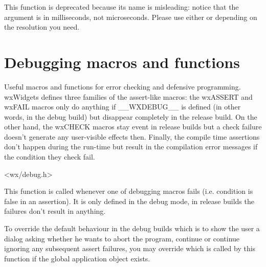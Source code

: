 \label{wxusleep}


This function is deprecated because its name is misleading: notice that the
argument is in milliseconds, not microseconds. Please use either
 or 
depending on the resolution you need.



\section{Debugging macros and functions}\label{debugmacros}

Useful macros and functions for error checking and defensive programming.
wxWidgets defines three families of the assert-like macros:
the wxASSERT and wxFAIL macros only do anything if \_\_WXDEBUG\_\_ is defined
(in other words, in the debug build) but disappear completely in the release
build. On the other hand, the wxCHECK macros stay event in release builds but a
check failure doesn't generate any user-visible effects then. Finally, the
compile time assertions don't happen during the run-time but result in the
compilation error messages if the condition they check fail.


<wx/debug.h>


\label{wxonassert}


This function is called whenever one of debugging macros fails (i.e. condition
is false in an assertion). It is only defined in the debug mode, in release
builds the  failures don't result in anything.

To override the default behaviour in the debug builds which is to show the user
a dialog asking whether he wants to abort the program, continue or continue
ignoring any subsequent assert failures, you may override
 which is called by this function if
the global application object exists.


\label{wxassert}


